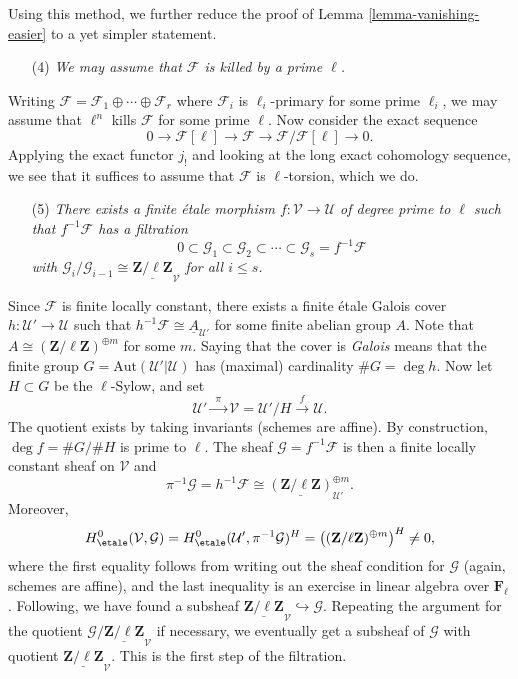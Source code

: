 \medskip\noindent
Using this method, we further reduce the proof of
Lemma \ref{lemma-vanishing-easier}
to a yet simpler statement.
\begin{enumerate}
\item[(4)]
{\it We may assume that $\mathcal{F}$ is killed by a prime $\ell$.}
\end{enumerate}
Writing $\mathcal{F} = \mathcal{F}_1 \oplus \cdots \oplus \mathcal{F}_r$ where
$\mathcal{F}_i$ is $\ell_i$-primary for some prime $\ell_i$, we may assume that
$\ell^n$ kills $\mathcal{F}$ for some prime $\ell$. Now consider the exact
sequence
$$
0 \to \mathcal{F}[\ell] \to \mathcal{F} \to \mathcal{F}/\mathcal{F}[\ell] \to 0.
$$
Applying the exact functor $j_!$ and looking at the long exact cohomology
sequence, we see that it suffices to assume that $\mathcal{F}$ is
$\ell$-torsion, which we do.
\begin{enumerate}
\item[(5)]
{\it There exists a finite \'etale morphism $f: \mathcal{V} \to \mathcal{U}$ of
degree prime to $\ell$ such that $f^{-1} \mathcal{F}$ has a filtration
$$
0 \subset \mathcal{G}_1 \subset \mathcal{G}_2 \subset \cdots \subset
\mathcal{G}_s = f^{-1} \mathcal{F}
$$
with $\mathcal{G}_i /\mathcal{G}_{i-1} \cong
\underline{\mathbf{Z}/\ell\mathbf{Z}}_\mathcal{V}$ for all $i \leq s$.}
\end{enumerate}
Since $\mathcal{F}$ is finite locally constant, there exists a finite \'etale
Galois cover $h : \mathcal{U}' \to \mathcal{U}$ such that $h^{-1} \mathcal{F}
\cong \underline{A}_{\mathcal{U}'}$ for some finite abelian group $A$. Note
that $A \cong (\mathbf{Z}/\ell\mathbf{Z})^{\oplus m}$ for some $m$. Saying that
the cover is {\it Galois} means that the finite group $G =
\text{Aut}(\mathcal{U}' | \mathcal{U})$ has (maximal) cardinality $\# G = \deg
h$. Now let $H \subset G$ be the $\ell$-Sylow, and set
$$
\mathcal{U}' \xrightarrow{\ \ \pi \ \ } \mathcal{V} = \mathcal{U}'/H
\xrightarrow{\ \ f \ \ } \mathcal{U}.
$$
The quotient exists by taking invariants (schemes are affine). By construction,
$\deg f = \#G/\#H$ is prime to $\ell$. The sheaf $\mathcal{G} = f^{-1}
\mathcal{F}$ is then a finite locally constant sheaf on $\mathcal{V}$ and
$$
\pi^{-1} \mathcal{G} = h^{-1}\mathcal{F} \cong
\underline{(\mathbf{Z}/\ell\mathbf{Z})}^{\oplus m}_{\mathcal{U}'}.
$$
Moreover,
$$
H_\etale^0(\mathcal{V}, \mathcal{G}) =
H_\etale^0(\mathcal{U}', \pi^{-1}\mathcal{G})^H =
\left((\mathbf{Z}/\ell\mathbf{Z})^{\oplus m}\right)^H \neq 0,
$$
where the first equality follows from writing out the sheaf condition for
$\mathcal{G}$ (again, schemes are affine), and the last inequality is an
exercise in linear algebra over $\mathbf{F}_\ell$. Following, we have found a
subsheaf $\underline{\mathbf{Z}/\ell\mathbf{Z}}_\mathcal{V} \hookrightarrow
\mathcal{G}$. Repeating the argument for the quotient $\mathcal{G}/
\underline{\mathbf{Z}/\ell\mathbf{Z}}_\mathcal{V}$ if necessary, we eventually
get a subsheaf of $\mathcal{G}$ with quotient
$\underline{\mathbf{Z}/\ell\mathbf{Z}}_\mathcal{V}$. This is the first step of
the filtration.

